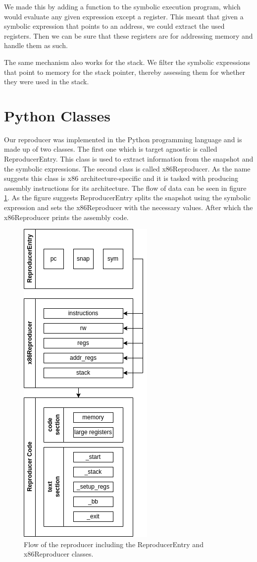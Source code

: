 We made this by adding a function to the symbolic execution program, which would evaluate any given expression except a register.
This meant that given a symbolic expression that points to an address, we could extract the used registers.
Then we can be sure that these registers are for addressing memory and handle them as such.

The same mechanism also works for the stack.
We filter the symbolic expressions that point to memory for the stack pointer, thereby assessing them for whether they were used in the stack.

\section{Python Classes}
Our reproducer was implemented in the Python programming language and is made up of two classes.
The first one which is target agnostic is called ReproducerEntry.
This class is used to extract information from the snapshot and the symbolic expressions.
The second class is called x86Reproducer.
As the name suggests this class is x86 architecture-specific and it is tasked with producing assembly instructions for its architecture.
The flow of data can be seen in figure \ref{fig:rep_ent}.
As the figure suggests ReproducerEntry splits the snapshot using the symbolic expression and sets the x86Reproducer with the necessary values.
After which the x86Reproducer prints the assembly code.

\begin{figure}[ht]
    \centering
    \includegraphics[width=0.5\linewidth]{figures/rep_ent}
    \caption{Flow of the reproducer including the ReproducerEntry and x86Reproducer classes.}
    \label{fig:rep_ent}
\end{figure}

